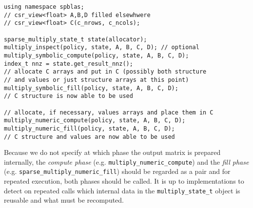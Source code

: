 \documentclass{article}
\begin{document}
\begin{verbatim}
using namespace spblas;
// csr_view<float> A,B,D filled elsewhwere
// csr_view<float> C(c_nrows, c_ncols);

sparse_multiply_state_t state(allocator);
multiply_inspect(policy, state, A, B, C, D); // optional
multiply_symbolic_compute(policy, state, A, B, C, D);
index_t nnz = state.get_result_nnz();
// allocate C arrays and put in C (possibly both structure
// and values or just structure arrays at this point)
multiply_symbolic_fill(policy, state, A, B, C, D);
// C structure is now able to be used

// allocate, if necessary, values arrays and place them in C
multiply_numeric_compute(policy, state, A, B, C, D);
multiply_numeric_fill(policy, state, A, B, C, D);
// C structure and values are now able to be used
\end{verbatim}

Because we do not specify at which phase the output matrix is prepared internally, the \textit{compute phase} (e.g. \texttt{multiply\_numeric\_compute}) and the \textit{fill phase} (e.g. \texttt{sparse\_multiply\_numeric\_fill}) should be regarded as a pair and for repeated execution, both phases should be called.  It is up to implementations to detect on repeated calls which internal data in the \texttt{multiply\_state\_t} object is reusable and what must be recomputed.
\end{document}
